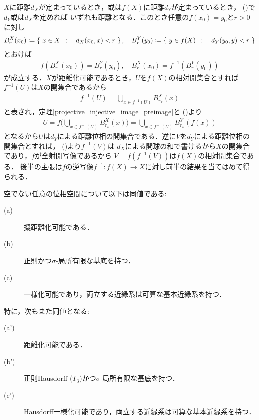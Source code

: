 	\begin{prf}
		$X$に距離$d_X$が定まっているとき，或は$f(X)$に距離$d_Y$が定まっているとき，
		()で$d_Y$或は$d_X$を定めれば
		いずれも距離となる．このとき任意の$f(x_0) = y_0$と$r > 0$に対し
		\begin{align}
			B^X_r(x_0) \coloneqq \left\{\ x \in X\ \, : \quad d_X(x_0,x) < r\ \right\},
			\quad B^Y_r(y_0) \coloneqq \left\{\ y \in f(X)\ \, : \quad d_Y(y_0,y) < r\ \right\}
		\end{align}
		とおけば
		\begin{align}
			f\left(B^X_r(x_0)\right) = B^Y_r(y_0),
			\quad B^X_r(x_0) = f^{-1}\left(B^Y_r(y_0)\right)
			\label{eq:thm_heredity_of_metrizability_2}
		\end{align}
		が成立する．$X$が距離化可能であるとき，$U$を$f(X)$の相対開集合とすれば
		$f^{-1}(U)$は$X$の開集合であるから
		\begin{align}
			f^{-1}(U) = \bigcup_{x \in f^{-1}(U)}B^X_{r_x}(x)
		\end{align}
		と表され，定理\ref{projective_injective_image_preimage}と
		()より
		\begin{align}
			U = f\Biggl(\bigcup_{x \in f^{-1}(U)}B^X_{r_x}(x)\Biggr)
			= \bigcup_{x \in f^{-1}(U)}B^Y_{r_x}(f(x))
		\end{align}
		となるから$U$は$d_Y$による距離位相の開集合である．逆に$V$を$d_Y$による距離位相の開集合とすれば，
		()より$f^{-1}(V)$は
		$d_X$による開球の和で書けるから$X$の開集合であり，$f$が全射開写像であるから
		$V = f\left(f^{-1}(V)\right)$は$f(X)$の相対開集合である．
		後半の主張は$f$の逆写像$f^{-1}:f(X) \longrightarrow X$に対し前半の結果を当てはめて得られる．
		\QED
	\end{prf}
	
	\begin{screen}
		\begin{thm}[距離化可能性の必要十分条件]\label{thm:Nagata_Smirnov_metrizability}
			空でない任意の位相空間について以下は同値である:
			\begin{description}
				\item[(a)] 擬距離化可能である．
				\item[(b)] 正則かつ$\sigma$-局所有限な基底を持つ．
				\item[(c)] 一様化可能であり，両立する近縁系は可算な基本近縁系を持つ．
			\end{description}
			特に，次もまた同値となる:
			\begin{description}
				\item[(a')] 距離化可能である．
				\item[(b')] 正則Hausdorff
					($T_3$)かつ$\sigma$-局所有限な基底を持つ．
				\item[(c')] Hausdorff一様化可能であり，両立する近縁系は可算な基本近縁系を持つ．
			\end{description}
		\end{thm}
	\end{screen}
	
